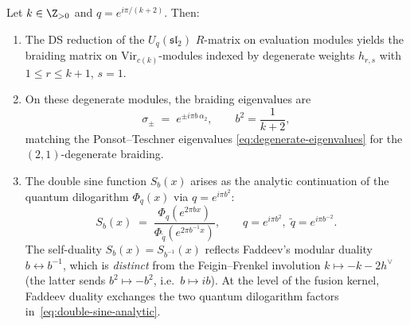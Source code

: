 \begin{theorem}
\label{thm:DS-transport-R}
Let\/ $k \in \Z_{>0}$ and $q = e^{i\pi/(k+2)}$. Then:
\begin{enumerate}[label=\textup{(\roman*)}]
\item The DS reduction of the $U_q(\mathfrak{sl}_2)$
 $R$-matrix on evaluation modules yields the braiding matrix
 on $\mathrm{Vir}_{c(k)}$-modules indexed by degenerate
 weights $h_{r,s}$ with $1 \le r \le k+1$, $s = 1$.

\item On these degenerate modules, the braiding eigenvalues are
 \begin{equation}\label{eq:degenerate-braiding}
 \sigma_\pm
 \;=\;
 e^{\pm i\pi b\,\alpha_2},
 \qquad
 b^2 = \frac{1}{k+2},
 \end{equation}
 matching the Ponsot--Teschner eigenvalues
 \eqref{eq:degenerate-eigenvalues} for the $(2,1)$-degenerate
 braiding.

\item The double sine function $S_b(x)$ arises as the
 analytic continuation of the quantum dilogarithm
 $\Phi_q(x)$ via $q = e^{i\pi b^2}$:
 \begin{equation}\label{eq:double-sine-analytic}
 S_b(x) \;=\; \frac{\Phi_{q}(e^{2\pi b x})}
 {\Phi_{\tilde q}(e^{2\pi b^{-1} x})},
 \qquad
 q = e^{i\pi b^2},\;
 \tilde q = e^{i\pi b^{-2}}.
 \end{equation}
 The self-duality $S_b(x) = S_{b^{-1}}(x)$ reflects Faddeev's modular duality $b \leftrightarrow b^{-1}$, which is \emph{distinct} from the Feigin--Frenkel involution $k \mapsto -k-2h^\vee$ (the latter sends $b^2 \mapsto -b^2$, i.e.\ $b \mapsto ib$). At the level of the fusion kernel, Faddeev duality exchanges the two quantum dilogarithm factors in~\eqref{eq:double-sine-analytic}.
\end{enumerate}
\end{theorem}

